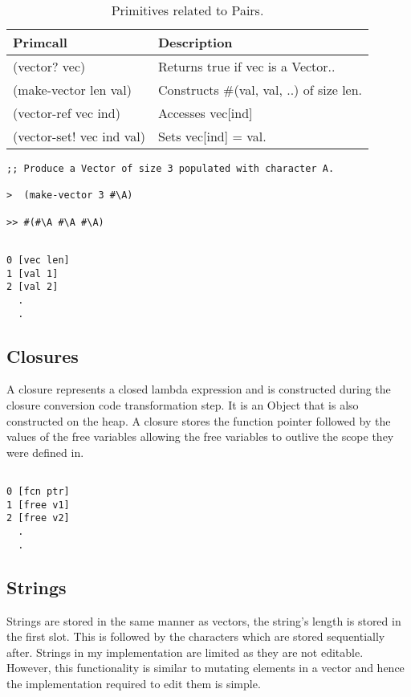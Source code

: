 \documentclass{article}
\begin{document}
\begin{table}[ht]
  \centering
\begin{tabular}{ l l }
  \toprule
  Primcall & Description \\ \hline
  \midrule
  (vector? vec) & Returns true if vec is a Vector.. \\
  (make-vector len val) & Constructs \#(val, val, ..) of size len. \\
  (vector-ref vec ind) & Accesses vec[ind] \\
  (vector-set! vec ind val) & Sets vec[ind] = val. \\
  \bottomrule
\end{tabular}
\caption{Primitives related to Pairs.} \label{tab:vectors}
\end{table}

\begin{verbatim}
;; Produce a Vector of size 3 populated with character A.

>  (make-vector 3 #\A) 

>> #(#\A #\A #\A)
\end{verbatim}


\begin{verbatim}

0 [vec len]
1 [val 1]
2 [val 2]
  .
  .

\end{verbatim}

\subsection{Closures}

A closure represents a closed lambda expression and is constructed during the closure conversion code transformation step. It is an Object that is also constructed on the heap. A closure stores the function pointer followed by the values of the free variables allowing the free variables to outlive the scope they were defined in.  

\begin{verbatim}

0 [fcn ptr]
1 [free v1]
2 [free v2]
  .
  .

\end{verbatim}

\subsection{Strings}

Strings are stored in the same manner as vectors, the string's length is stored in the first slot. This is followed by the characters which are stored sequentially after. Strings in my implementation are limited as they are not editable. However, this functionality is similar to mutating elements in a vector and hence the implementation required to edit them is simple.
\end{document}

